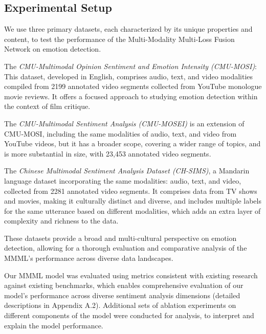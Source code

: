 \documentclass[11pt]{article}
\begin{document}
\subsection{Experimental Setup}
We use three primary datasets, each characterized by its unique properties and content, to test the performance of the Multi-Modality Multi-Loss Fusion Network on emotion detection.  

The {\it CMU-Multimodal Opinion Sentiment and Emotion Intensity (CMU-MOSI)}\cite{zadeh2016mosi}: This dataset, developed in English, comprises audio, text, and video modalities compiled from 2199 annotated video segments collected from YouTube monologue movie reviews.  It offers a focused approach to studying emotion detection within the context of film critique.   

The {\it CMU-Multimodal Sentiment Analysis (CMU-MOSEI)}\cite{bagher-zadeh-etal-2018-multimodal} is an extension of CMU-MOSI, including the same modalities of audio, text, and video from YouTube videos, but it has a broader scope, covering a wider range of topics, and is more substantial in size, with 23,453 annotated video segments.

The {\it Chinese Multimodal Sentiment Analysis Dataset (CH-SIMS)}\cite{yu-etal-2020-ch}, a Mandarin language dataset incorporating the same modalities: audio, text, and video, collected from 2281 annotated video segments. It comprises data from TV shows and movies, making it culturally distinct and diverse, and includes multiple labels for the same utterance based on different modalities, which adds an extra layer of complexity and richness to the data.

These datasets provide a broad and multi-cultural perspective on emotion detection, allowing for a thorough evaluation and comparative analysis of the MMML's performance across diverse data landscapes.


Our MMML model was evaluated using metrics consistent with existing research against existing benchmarks, which enables comprehensive evaluation of our model's performance across diverse sentiment analysis dimensions (detailed descriptions in Appendix A.2). Additional sets of ablation experiments on different components of the model were conducted for analysis, to interpret and explain the model performance. 
\end{document}
